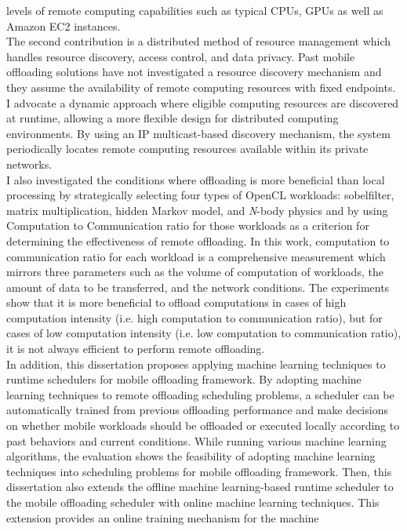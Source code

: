 levels of remote computing capabilities such as typical CPUs, GPUs as
well as Amazon EC2 instances.\\
%
The second contribution is a distributed method of resource management
which handles resource discovery, access control, and data privacy.
%
Past mobile offloading solutions have not investigated a resource
discovery mechanism and they assume the availability of remote computing
resources with fixed endpoints.
%
I advocate a dynamic approach where eligible computing resources are
discovered at runtime, allowing a more flexible design for distributed
computing environments.
%
By using an IP multicast-based discovery mechanism, the system periodically locates
remote computing resources available within its private networks.\\
%
I also investigated the conditions where offloading is more beneficial
than local processing by strategically selecting four types of OpenCL workloads:
sobelfilter, matrix multiplication, hidden Markov model, and {\it N}-body
physics and by using Computation to Communication ratio for those
workloads as a criterion for determining the effectiveness of remote
offloading.
%
In this work, computation to communication ratio for each workload is a
comprehensive measurement which mirrors three parameters such as the
volume of computation of workloads, the amount of data to be
transferred, and the network conditions.
%
The experiments show that it is more beneficial to offload computations
in cases of high computation intensity (i.e. high
computation to communication ratio), but for cases of low computation
intensity (i.e. low computation to communication ratio), it is not always
efficient to perform remote offloading.\\
%
In addition, this dissertation proposes applying machine learning
techniques to runtime schedulers for mobile offloading framework.
%
By adopting machine learning techniques to remote offloading
scheduling problems, a scheduler can be automatically trained from
previous offloading performance and make decisions on whether mobile
workloads should be offloaded or executed locally according to past
behaviors and current conditions.
%
While running various machine learning algorithms, the evaluation shows the
feasibility of adopting machine learning techniques into scheduling
problems for mobile offloading framework.
%
Then, this dissertation also extends the offline machine
learning-based runtime scheduler to the mobile offloading scheduler with
online machine learning techniques.
%
This extension provides an online training mechanism for the machine
